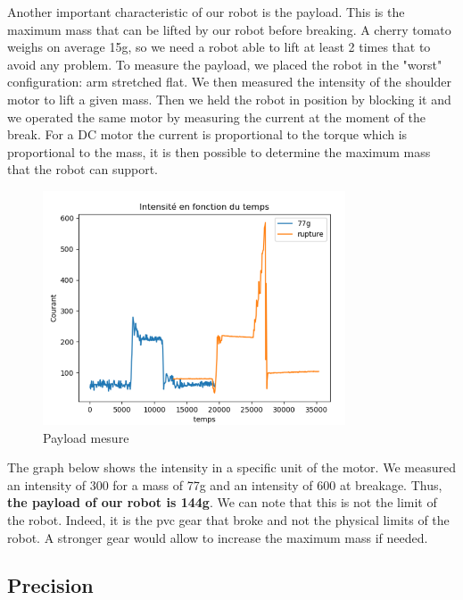 Another important characteristic of our robot is the payload. This is the maximum mass that can be lifted by our robot before breaking. A cherry tomato weighs on average 15g, so we need a robot able to lift at least 2 times that to avoid any problem. To measure the payload, we placed the robot in the "worst" configuration: arm stretched flat. We then measured the intensity of the shoulder motor to lift a given mass. Then we held the robot in position by blocking it and we operated the same motor by measuring the current at the moment of the break. For a DC motor the current is proportional to the torque which is proportional to the mass, it is then possible to determine the maximum mass that the robot can support. 
\begin{figure}[ht]
    \centering
    \includegraphics[width=0.8\textwidth]{images/Section04/payload.png}
    \caption{Payload mesure}
    \label{fig:mesh25}
\end{figure}
\FloatBarrier

The graph below shows the intensity in a specific unit of the motor. We measured an intensity of 300 for a mass of 77g and an intensity of 600 at breakage. Thus, \textbf{the payload of our robot is 144g}. We can note that this is not the limit of the robot. Indeed, it is the pvc gear that broke and not the physical limits of the robot. A stronger gear would allow to increase the maximum mass if needed.

\subsection{Precision}

